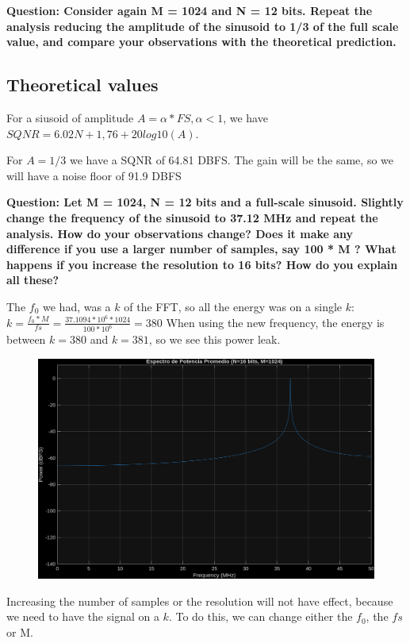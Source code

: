 \vspace{1cm}

\textbf{Question: Consider again M = 1024 and N = 12 bits. Repeat the analysis reducing the amplitude of
    the sinusoid to 1/3 of the full scale value, and compare your observations with the theoretical
    prediction.
}
\subsection{Theoretical values}
For a siusoid of amplitude $A =\alpha * FS , \alpha < 1$, we have $SQNR = 6.02N + 1,76 + 20log{10}(A)$.

For $A=1/3$ we have a SQNR of 64.81 DBFS. The gain will be the same, so we will have a noise floor of 91.9 DBFS


\vspace{1cm}

\textbf{Question: Let M = 1024, N = 12 bits and a full-scale sinusoid. Slightly change the frequency of the
    sinusoid to 37.12 MHz and repeat the analysis. How do your observations change? Does it make
    any difference if you use a larger number of samples, say 100 * M ? What happens if you increase
    the resolution to 16 bits?
    How do you explain all these?
}

The $f_0$ we had, was a $k$ of the FFT, so all the energy was on a single $k$: $ k =\frac{f_0*M}{fs} = \frac{37.1094*10^6*1024}{100*10^6}= 380$
When using the new frequency, the energy is between $k = 380$ and $k = 381$, so we see this power leak.

\begin{figure}[H]
    \centering
    \includegraphics[width=1\textwidth]{img/task4_5.png}
    \label{fig:task4_5}
\end{figure}

Increasing the number of samples or the resolution will not have effect, because we need to have the signal on a $k$.
To do this, we can change either the $f_0$, the $fs$ or M.